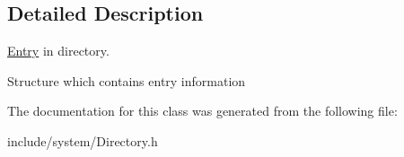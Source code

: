 \subsection{Detailed Description}
\hyperlink{struct_f_t_p_1_1_directory_1_1_entry}{Entry} in directory. 

Structure which contains entry information 

The documentation for this class was generated from the following file\-:\begin{DoxyCompactItemize}
\item 
include/system/Directory.\-h\end{DoxyCompactItemize}
